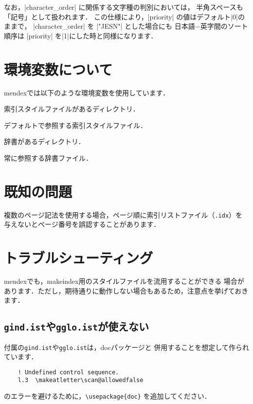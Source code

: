\documentclass[a4paper]{jsarticle}
\newcommand{\SoftName}[1]{\textsf{#1}}
\newcommand{\FileName}[1]{\texttt{#1}}
\newcommand{\FileExtension}[1]{\texttt{.#1}}
\begin{document}
なお，|character_order| に関係する文字種の判別においては，
半角スペースも「記号」として扱われます．
この仕様により，|priority| の値はデフォルト|0|のままで，
|character_order| を |"JESN"| とした場合にも
日本語−英字間のソート順序は |priority| を|1|にした時と同様になります．

\section{環境変数について}

\SoftName{mendex}では以下のような環境変数を使用しています．

\begin{description}[leftmargin=5cm]
\item[|INDEXSTYLE|]
索引スタイルファイルがあるディレクトリ．

\item[|INDEXDEFAULTSTYLE|]
デフォルトで参照する索引スタイルファイル．

\item[|INDEXDICTIONARY|]
辞書があるディレクトリ．

\item[|INDEXDEFAULTDICTIONARY|]
常に参照する辞書ファイル．
\end{description}

\section{既知の問題}
複数のページ記法を使用する場合，ページ順に索引リストファイル（\FileExtension{idx}）を
与えないとページ番号を誤認することがあります．


\section{トラブルシューティング}
\SoftName{mendex}でも，\SoftName{makeindex}用のスタイルファイルを流用することができる
場合があります．ただし，期待通りに動作しない場合もあるため，注意点を挙げておきます．

\subsection{\FileName{gind.ist}や\FileName{gglo.ist}が使えない}
\LaTeXe 付属の\FileName{gind.ist}や\FileName{gglo.ist}は，\SoftName{doc}パッケージと
併用することを想定して作られています．
\begin{verbatim}
    ! Undefined control sequence.
    l.3  \makeatletter\scan@allowedfalse
\end{verbatim}
のエラーを避けるために，\verb+\usepackage{doc}+ を追加してください．
\end{document}
